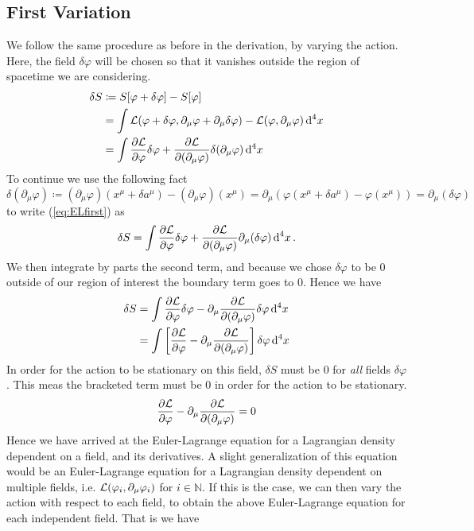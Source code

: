 \subsection{First Variation}
We follow the same procedure as before in the derivation, by varying the action. Here, the field $\delta\varphi$ will be chosen so that it vanishes outside the region of spacetime we are considering.
\begin{align}\label{eq:ELfirst}
\delta S & \coloneqq S[\varphi + \delta\varphi] - S[\varphi] \nonumber\\
 & = \int \mathcal{L}(\varphi + \delta\varphi, \partial_\mu\varphi + \partial_\mu\delta\varphi) - \mathcal{L}(\varphi, \partial_\mu\varphi)\dd[4]{x} \nonumber \\
 & = \int \pdv{\mathcal{L}}{\varphi}\delta\varphi + \pdv{\mathcal{L}}{(\partial_\mu\varphi)}\delta{(\partial_\mu\varphi)}\dd[4]{x}
\end{align}
To continue we use the following fact
\begin{equation*}
\delta(\partial_\mu\varphi)\coloneqq (\partial_\mu\varphi)(x^\mu + \delta a^\mu) - (\partial_\mu\varphi)(x^\mu) = \partial_\mu(\varphi(x^\mu + \delta a^\mu) - \varphi(x^\mu)) = \partial_\mu(\delta\varphi)
\end{equation*}
to write (\ref{eq:ELfirst}) as
\begin{equation}
\delta S = \int \pdv{\mathcal{L}}{\varphi}\delta\varphi + \pdv{\mathcal{L}}{(\partial_\mu\varphi)}\partial_\mu(\delta\varphi)\dd[4]{x}.
\end{equation}
We then integrate by parts the second term, and because we chose $\delta\varphi$ to be 0 outside of our region of interest the boundary term goes to 0. Hence we have
\begin{align}
\delta S & = \int \pdv{\mathcal{L}}{\varphi}\delta\varphi - \partial_\mu\pdv{\mathcal{L}}{(\partial_\mu\varphi)}\delta\varphi\dd[4]{x} \nonumber\\
 & = \int \left[\pdv{\mathcal{L}}{\varphi} - \partial_\mu \pdv{\mathcal{L}}{(\partial_\mu\varphi)} \right]\delta\varphi\dd[4]{x}
\end{align}
In order for the action to be stationary on this field, $\delta S$ must be 0 for \textit{all} fields $\delta\varphi$. This meas the bracketed term must be 0 in order for the action to be stationary.
\begin{equation}\label{eq:ELfields}
\pdv{\mathcal{L}}{\varphi} - \partial_\mu \pdv{\mathcal{L}}{(\partial_\mu\varphi)} = 0
\end{equation}
Hence we have arrived at the Euler-Lagrange equation for a Lagrangian density dependent on a field, and its derivatives. A slight generalization of this equation would be an Euler-Lagrange equation for a Lagrangian density dependent on multiple fields, i.e. $\mathcal{L}(\varphi_i,\partial_\mu\varphi_i)$ for $i\in\mathbb{N}$. If this is the case, we can then vary the action with respect to each field, to obtain the above Euler-Lagrange equation for each independent field. That is we have 
